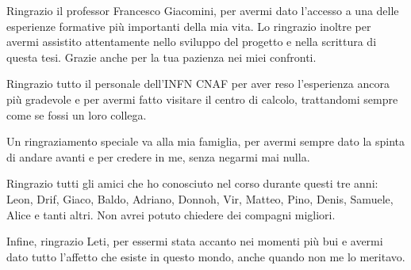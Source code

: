 \documentclass[12pt,a4paper,openright,twoside]{report}
\begin{document}
Ringrazio il professor Francesco Giacomini, per avermi dato l'accesso a una delle esperienze formative più importanti della mia vita. Lo ringrazio 
inoltre per avermi assistito attentamente nello sviluppo del progetto e nella scrittura di questa tesi. Grazie anche per la tua pazienza nei miei confronti.  

Ringrazio tutto il personale dell'INFN CNAF per aver reso l'esperienza ancora più gradevole e per avermi fatto visitare il centro di calcolo, trattandomi sempre come se fossi un loro collega.  

Un ringraziamento speciale va alla mia famiglia, per avermi sempre dato la spinta di andare avanti e per credere in me, senza negarmi mai nulla. 

Ringrazio tutti gli amici che ho conosciuto nel corso durante questi tre anni: Leon, Drif, Giaco, Baldo, Adriano, Donnoh, Vir, Matteo, Pino, Denis, Samuele, Alice e tanti altri. Non avrei potuto chiedere dei compagni migliori. 


Infine, ringrazio Leti, per essermi stata accanto nei momenti più bui e avermi dato tutto l'affetto che esiste in questo mondo, anche quando non me lo meritavo.  
\end{document}

